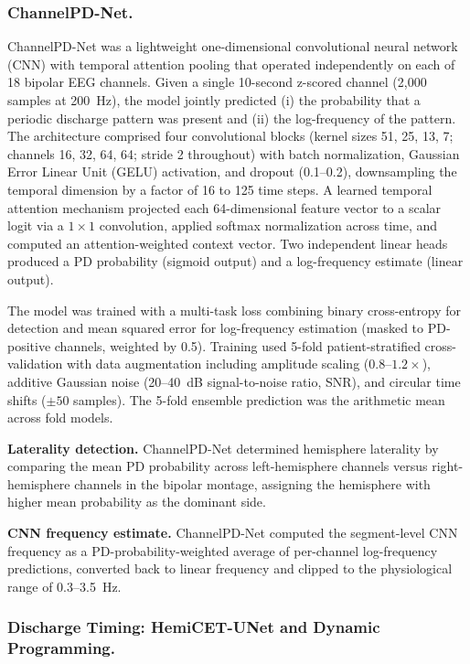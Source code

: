 \documentclass{iopjournal}
\begin{document}
\subsubsection{ChannelPD-Net.}

ChannelPD-Net was a lightweight one-dimensional convolutional neural network (CNN) with temporal attention pooling that operated independently on each of 18 bipolar EEG channels. Given a single 10-second z-scored channel (2,000 samples at 200~Hz), the model jointly predicted (i) the probability that a periodic discharge pattern was present and (ii) the log-frequency of the pattern. The architecture comprised four convolutional blocks (kernel sizes 51, 25, 13, 7; channels 16, 32, 64, 64; stride 2 throughout) with batch normalization, Gaussian Error Linear Unit (GELU) activation, and dropout (0.1--0.2), downsampling the temporal dimension by a factor of 16 to 125 time steps. A learned temporal attention mechanism projected each 64-dimensional feature vector to a scalar logit via a $1 \times 1$ convolution, applied softmax normalization across time, and computed an attention-weighted context vector. Two independent linear heads produced a PD probability (sigmoid output) and a log-frequency estimate (linear output).

The model was trained with a multi-task loss combining binary cross-entropy for detection and mean squared error for log-frequency estimation (masked to PD-positive channels, weighted by 0.5). Training used 5-fold patient-stratified cross-validation with data augmentation including amplitude scaling ($0.8$--$1.2\times$), additive Gaussian noise (20--40~dB signal-to-noise ratio, SNR), and circular time shifts ($\pm 50$ samples). The 5-fold ensemble prediction was the arithmetic mean across fold models.

\textbf{Laterality detection.} ChannelPD-Net determined hemisphere laterality by comparing the mean PD probability across left-hemisphere channels versus right-hemisphere channels in the bipolar montage, assigning the hemisphere with higher mean probability as the dominant side.

\textbf{CNN frequency estimate.} ChannelPD-Net computed the segment-level CNN frequency as a PD-probability-weighted average of per-channel log-frequency predictions, converted back to linear frequency and clipped to the physiological range of 0.3--3.5~Hz.

\subsubsection{Discharge Timing: HemiCET-UNet and Dynamic Programming.}
\end{document}
